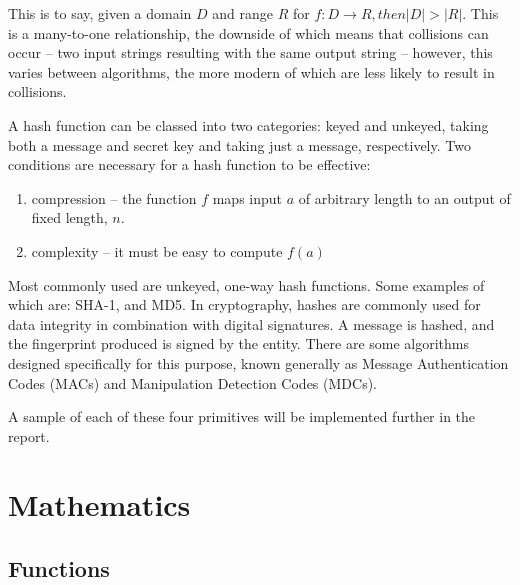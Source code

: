 This is to say, given a domain $D$ and range $R$ for $f : D \rightarrow R, then |D| > |R|$. This is a many-to-one relationship, the downside of which means that collisions can occur -- two input strings resulting with the same output string -- however, this varies between algorithms, the more modern of which are less likely to result in collisions.

A hash function can be classed into two categories: keyed and unkeyed, taking both a message and secret key and taking just a message, respectively. Two conditions are necessary for a hash function to be effective:

\begin{enumerate}
	\item compression -- the function $f$ maps input $a$ of arbitrary length to an output of fixed length, $n$.
	\item complexity -- it must be easy to compute $f(a)$
\end{enumerate}

Most commonly used are unkeyed, one-way hash functions. Some examples of which are: SHA-1, and MD5. In cryptography, hashes are commonly used for data integrity in combination with digital signatures. A message is hashed, and the fingerprint produced is signed by the entity. There are some algorithms designed specifically for this purpose, known generally as Message Authentication Codes (MACs) and Manipulation Detection Codes (MDCs).

A sample of each of these four primitives will be implemented further in the report.

\section{Mathematics}

\subsection{Functions}
